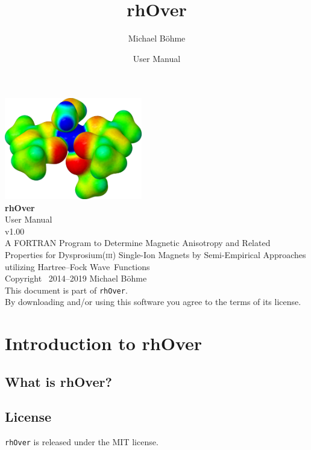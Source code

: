 \documentclass[11pt]{article}
\title{rhOver}
\author{Michael B\"{o}hme}
\date{User Manual}
\begin{document}
\pagestyle{empty}

\begin{center}
 
 \vspace*{180pt}
 \includegraphics[width=6cm]{DEPP} \\[10pt]
 
 \Huge{\bfseries rhOver} \\[20pt]
 \normalsize
 User Manual \\
 v1.00 \\[45pt]
 A FORTRAN Program to Determine Magnetic Anisotropy and Related Properties for Dysprosium(\textsc{iii}) Single-Ion Magnets by Semi-Empirical Approaches utilizing Hartree--Fock \mbox{Wave Functions} \\[25pt]
  
 Copyright \textcopyright~2014--2019 Michael Böhme \\
 This document is part of \texttt{rhOver}. \\ 
 By downloading and/or using this software you agree to the terms of its license.
\end{center}

\clearpage
\pagestyle{plain}

\tableofcontents
	
\clearpage
\section{Introduction to rhOver}

\subsection{What is rhOver?}

\clearpage
\subsection{License}

\texttt{rhOver} is released under the MIT license. \\
\end{document}
